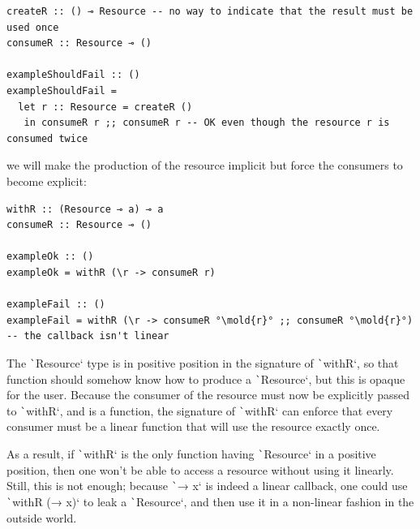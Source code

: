 \documentclass[english]{jflart}
\newcommand{\mold}[1]{\colorbox{red}{#1}}
\begin{document}
{\small
\begin{verbatim}
createR :: () ⊸ Resource -- no way to indicate that the result must be used once
consumeR :: Resource ⊸ ()

exampleShouldFail :: ()
exampleShouldFail =
  let r :: Resource = createR ()
   in consumeR r ;; consumeR r -- OK even though the resource r is consumed twice
\end{verbatim}
}

we will make the production of the resource implicit but force the consumers to become explicit:

{\small
\begin{verbatim}
withR :: (Resource ⊸ a) ⊸ a
consumeR :: Resource ⊸ ()

exampleOk :: ()
exampleOk = withR (\r -> consumeR r)

exampleFail :: ()
exampleFail = withR (\r -> consumeR °\mold{r}° ;; consumeR °\mold{r}°) -- the callback isn't linear
\end{verbatim}
}

The \texttt`Resource` type is in positive position in the signature of \texttt`withR`, so that function should somehow know how to produce a \texttt`Resource`, but this is opaque for the user. Because the consumer of the resource must now be explicitly passed to \texttt`withR`, and is a function, the signature of \texttt`withR` can enforce that every consumer must be a linear function that will use the resource exactly once.

As a result, if \texttt`withR` is the only function having \texttt`Resource` in a positive position, then one won't be able to access a resource without using it linearly. Still, this is not enough; because \texttt`\x → x` is indeed a linear callback, one could use \texttt`withR (\x → x)` to leak a \texttt`Resource`, and then use it in a non-linear fashion in the outside world.
\end{document}
